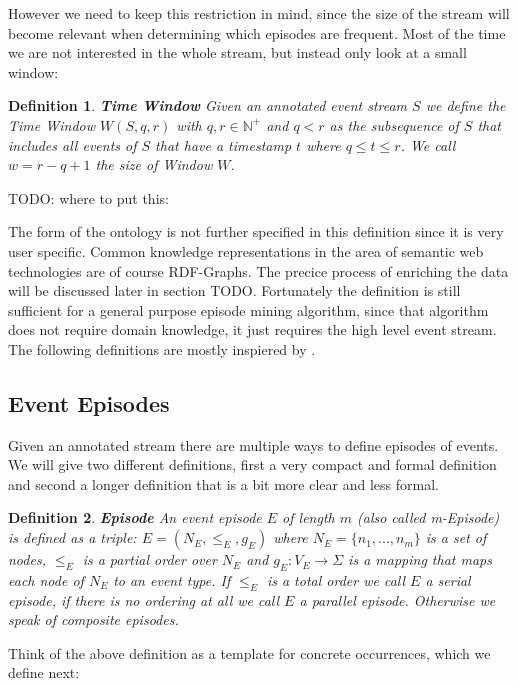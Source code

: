 \documentclass[journal]{IEEEtran}
\newtheorem{mydef}{Definition}
\begin{document}
However we need to keep this restriction in mind, since the size of the stream will become relevant when determining which episodes are frequent. Most of the time we are not interested in the whole stream, but instead only look at a small window:

\begin{mydef}
\textbf{Time Window} Given an annotated event stream $S$ we define the Time Window $W(S,q,r)$ with $q,r \in \mathbb{N}^+$ and $q < r$ as the subsequence of $S$ that includes all events of $S$ that have a timestamp $t$ where $q \leq t\leq r$. We call $w = r-q+1$ the size of Window $W$.
\end{mydef}

TODO: where to put this:

The form of the ontology is not further specified in this definition since it is very user specific. Common knowledge representations in the area of semantic web technologies are of course RDF-Graphs. The precice process of enriching the data will be discussed later in section TODO.
Fortunately the definition is still sufficient for a general purpose episode mining algorithm, since that algorithm does not require domain knowledge, it just requires the high level event stream. The following definitions are mostly inspiered by \cite{generatingDiverse}.

\subsection{Event Episodes}

Given an annotated stream there are multiple ways to define episodes of events. We will give two different definitions, first a very compact and formal definition and second a longer definition that is a bit more clear and less formal.

\begin{mydef}
\textbf{Episode} An event episode $E$ of length $m$ (also called m-Episode) is defined as a triple: $E = (N_E,{\leq}_{E},g_E)$ where $N_E = \{n_1,...,n_m\}$ is a set of nodes, ${\leq}_{E}$ is a partial order over $N_E$ and $g_E : V_E \rightarrow \Sigma$ is a mapping that maps each node of $N_E$ to an event type. If ${\leq}_{E}$ is a total order we call $E$ a serial episode, if there is no ordering at all we call $E$ a parallel episode. Otherwise we speak of composite episodes.
\end{mydef}

Think of the above definition as a template for concrete occurrences, which we define next:
\end{document}
